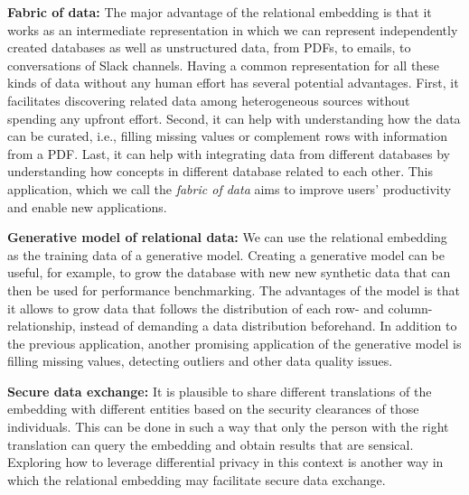 \noindent\textbf{Fabric of data: }The major advantage of the relational
embedding is that it works as an intermediate representation in which we can
represent independently created databases as well as unstructured data, from
PDFs, to emails, to conversations of Slack channels. Having a common
representation for all these kinds of data without any human effort has several
potential advantages. First, it facilitates discovering related data among
heterogeneous sources without spending any upfront effort. Second, it can help
with understanding how the data can be curated, i.e., filling missing values or
complement rows with information from a PDF. Last, it can help with integrating
data from different databases by understanding how concepts in different
database related to each other. This application, which we call the \emph{fabric
of data} aims to improve users' productivity and enable new applications.
%

\noindent\textbf{Generative model of relational data: }We can use the relational
embedding as the training data of a generative model. Creating a generative
model can be useful, for example, to grow the database with new new synthetic
data that can then be used for performance benchmarking. The advantages of the
model is that it allows to grow data that follows the distribution of each row-
and column-relationship, instead of demanding a data distribution beforehand. In
addition to the previous application, another promising application of the
generative model is filling missing values, detecting outliers and other data
quality issues.

\noindent\textbf{Secure data exchange: }It is plausible to share different
translations of the embedding with different entities based on the security
clearances of those individuals. This can be done in such a way that only the
person with the right translation can query the embedding and obtain results
that are sensical. Exploring how to leverage differential privacy in this
context is another way in which the relational embedding may facilitate secure
data exchange.

\tinyskip


